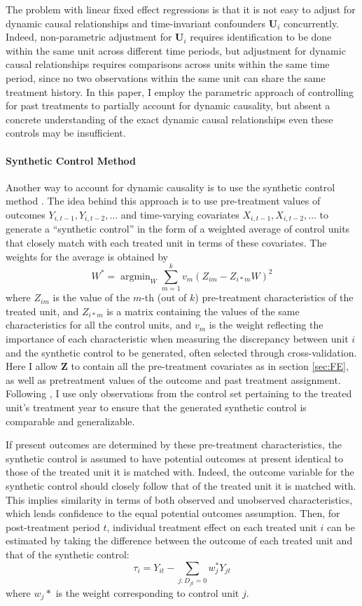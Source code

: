 \documentclass[12pt]{article}\usepackage[]{graphicx}\usepackage[]{color}
\newcommand{\1}{\mathbbm{1}}
\DeclareMathOperator*{\argmin}{argmin}
\begin{document}
The problem with linear fixed effect regressions is that it is not easy to adjust for dynamic causal relationships and time-invariant confounders $\mathbf{U}_i$ concurrently. Indeed, non-parametric adjustment for $\mathbf{U}_i$ requires identification to be done within the same unit across different time periods, but adjustment for dynamic causal relationships requires comparisons across units within the same time period, since no two observations within the same unit can share the same treatment history. In this paper, I employ the parametric approach of controlling for past treatments to partially account for dynamic causality, but absent a concrete understanding of the exact dynamic causal relationships even these controls may be insufficient. 

\paragraph{Synthetic Control Method}
\label{sec:syp}

Another way to account for dynamic causality is to use the synthetic control method \citep{Abadie2010, Abadie2015}. The idea behind this approach is to use pre-treatment values of outcomes $Y_{i,t-1},Y_{i, t-2},\dots$ and time-varying covariates $X_{i,t-1},X_{i, t-2},\dots$ to generate a ``synthetic control'' in the form of a weighted average of control units that closely match with each treated unit in terms of these covariates. The weights for the average is obtained by
$$
	W^* = \argmin_W \sum_{m=1}^{k}v_m(Z_{im} - Z_{i*m}W)^2
$$
where $Z_{im}$ is the value of the $m$-th (out of $k$) pre-treatment characteristics of the treated unit, and $Z_{i*m}$ is a matrix containing the values of the same characteristics for all the control units, and $v_m$ is the weight reflecting the importance of each characteristic when measuring the discrepancy between unit $i$ and the synthetic control to be generated, often selected through cross-validation. Here I allow $\mathbf{Z}$ to contain all the pre-treatment covariates as in section \ref{sec:FE}, as well as pretreatment values of the outcome and past treatment assignment. Following \cite{Abadie2010, Abadie2015}, I use only observations from the control set pertaining to the treated unit's treatment year to ensure that the generated synthetic control is comparable and generalizable.

If present outcomes are determined by these pre-treatment characteristics, the synthetic control is assumed to have potential outcomes at present identical to those of the treated unit it is matched with. Indeed, the outcome variable for the synthetic control should closely follow that of the treated unit it is matched with. This implies similarity in terms of both observed and unobserved characteristics, which lends confidence to the equal potential outcomes assumption. Then, for post-treatment period $t$, individual treatment effect on each treated unit $i$ can be estimated by taking the difference between the outcome of each treated unit and that of the synthetic control:
$$
	\tau_i = Y_{it} - \sum_{j:D_{jt}=0}w_j^*Y_{jt}
$$
where $w_j*$ is the weight corresponding to control unit $j$. 
\end{document}
